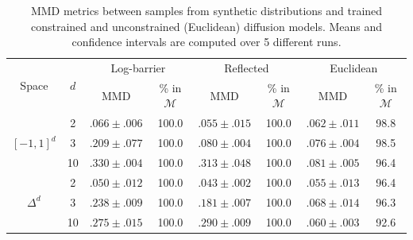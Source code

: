 \setlength{\tabcolsep}{13pt}
\begin{table}[t]
	\centering
	\caption{
		MMD metrics between samples from synthetic distributions and trained constrained and unconstrained (Euclidean) diffusion models.
		Means and confidence intervals are computed over 5 different runs.
	}
	\label{tab:synthetic_polytope}
	\begin{tabular}{cccccccc}
		\toprule
		\multirow{2}{*}{Space}      & \multirow{2}{*}{$d$} & \multicolumn{2}{c}{Log-barrier} & \multicolumn{2}{c}{Reflected} & \multicolumn{2}{c}{Euclidean}                                                                \\
		                            &                      & \textsc{MMD}                    & \% in $\mathcal{M}$           & \textsc{MMD}                  & \% in $\mathcal{M}$ & \textsc{MMD}     & \% in $\mathcal{M}$ \\
		\midrule
		\multirow{3}{*}{$[-1,1]^d$} & 2                    & $.066 \pm{.006}$                & 100.0                         & $.055 \pm{.015}$              & 100.0               & $.062 \pm{.011}$ & 98.8                \\
		                            & 3                    & $.209 \pm{.077}$                & 100.0                         & $.080 \pm{.004}$              & 100.0               & $.076 \pm{.004}$ & 98.5                \\
		                            & 10                   & $.330 \pm{.004}$                & 100.0                         & $.313 \pm{.048}$              & 100.0               & $.081 \pm{.005}$ & 96.4                \\
		\midrule
		\multirow{3}{*}{$\Delta^d$} & 2                    & $.050 \pm{.012}$                & 100.0                         & $.043 \pm{.002}$              & 100.0               & $.055 \pm{.013}$ & 96.4                \\
		                            & 3                    & $.238 \pm{.009}$                & 100.0                         & $.181 \pm{.007}$              & 100.0               & $.068\pm{.014}$  & 96.3                \\
		                            & 10                   & $.275 \pm{.015}$                & 100.0                         & $.290 \pm{.009}$              & 100.0               & $.060	\pm{.003}$ & 92.6                \\
		\bottomrule
	\end{tabular}
\end{table}

